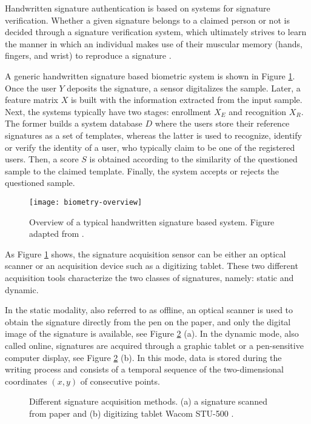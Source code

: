Handwritten signature authentication is based on systems for signature verification. 
Whether a given signature belongs to a claimed person or not is decided through a signature verification system, which ultimately strives to learn the manner in which
an individual makes use of their muscular memory (hands,
fingers, and wrist) to reproduce a signature \cite{gupta1997review}. 

A generic handwritten signature based biometric system is shown in Figure \ref{fig_ahsv-overview}. Once the user {\boldm $Y$} deposits the signature, a sensor digitalizes the sample. Later, a feature matrix {\boldm $X$} is built with the information extracted from the input sample. Next, the systems typically have two stages: enrollment {\boldm $X_{E}$} and recognition {\boldm $X_{R}$}. The former builds a system database {\boldm $D$} where the users store their reference signatures as a set of templates, whereas the latter is
used to recognize, identify or verify the identity of a user, who typically claim to be one of the registered users. Then, a score {\boldm $S$} is obtained according to the similarity of the
questioned sample to the claimed template. Finally, the system accepts or rejects the questioned sample.

\begin{figure}[!htb]
\centering
\texttt{[image: biometry-overview]}
\caption{Overview of a typical handwritten signature based system. Figure adapted from \cite{jain2016}.}
\label{fig_ahsv-overview}
\end{figure}

As Figure \ref{fig_ahsv-overview} shows, the signature acquisition sensor can be either an optical scanner or an acquisition device such as a digitizing tablet. These two different acquisition tools characterize the two classes of signatures, namely: static and dynamic. 

In the static modality, also referred to as offline, an optical scanner is used to obtain the signature directly from the pen on the paper, and only the digital image of the signature is available, see Figure \ref{fig:acquisition} (a). In the dynamic mode, also called online, signatures are acquired through a graphic tablet or a pen-sensitive computer display, see Figure \ref{fig:acquisition} (b). In this mode, data is stored during the writing process and consists of a temporal sequence of the two-dimensional coordinates $(x, y)$ of consecutive points. 

\begin{figure}[!htpb]
\centering
\hspace*{0.5in} %
\caption{Different signature acquisition methods. (a) a signature scanned from paper and (b) digitizing tablet Wacom STU-500 \cite{wacom2016}. } \label{fig:acquisition}
\end{figure}

